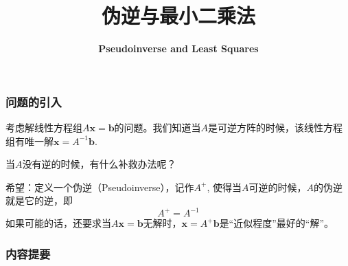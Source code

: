 



\title[Pseudoinverse and Least Squares]{\LARGE \bfseries 伪逆与最小二乘法} %
\author[] %
{\Large \bfseries Pseudoinverse and Least Squares}
\date{}






\begin{frame}

\titlepage %

\end{frame}


\begin{frame}
\frametitle{问题的引入}

考虑解线性方程组$A\mathbf{x} = \mathbf{b}$的问题。我们知道当$A$是可逆方阵的时候，该线性方程组有唯一解$\mathbf{x} = A^{-1}\mathbf{b}$.

\vspace{1em}

当$A$没有逆的时候，有什么补救办法呢？

\vspace{1em}

希望：定义一个伪逆（Pseudoinverse），记作$A^+$, 使得当$A$可逆的时候，$A$的伪逆就是它的逆，即
$$A^+ = A^{-1}$$
如果可能的话，还要求当$A\mathbf{x} = \mathbf{b}$无解时，$\mathbf{x} = A^+\mathbf{b}$是``近似程度''最好的``解''。

\end{frame}


\begin{frame}
\frametitle{内容提要} %
\tableofcontents %
\end{frame}

